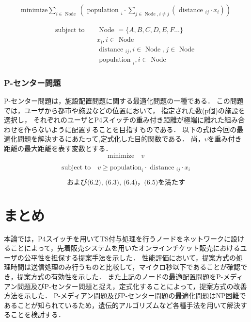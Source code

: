 \documentclass[a4j,11pt]{jreport}
\begin{document}
\begin{align}
  \label{p-median}
  \mbox{minimize}    \sum_{i \in \mbox{ Node }}\left(\mbox { population }_i \cdot \sum_{j \in \mbox { Node }, i \neq j}\left(\mbox { distance }_{i j} \cdot x_{i}\right)\right)
\end{align}

\begin{align}
  \text{subject to} \quad & \mbox{ Node }=\{A, B, C, D, E, F\dots\}                              \\
                          & x_{i}, i \in \mbox { Node }                                          \\
                          & \mbox { distance }_{i j}, i \in \mbox { Node }, j \in \mbox { Node } \\
                          & \mbox { population }_i, i \in \mbox { Node }
\end{align}


\subsection{P-センター問題}
P-センター問題は，施設配置問題に関する最適化問題の一種である．
この問題では，ユーザから都市や施設などの位置において，
指定された数(p個)の施設を選択し，
それぞれのユーザとP4スイッチの重み付き距離が極端に離れた組み合わせを作らないように配置することを目指すものである．
以下の式は今回の最適化問題を解決するにあたって,定式化した目的関数である．
尚，$v$を重み付き距離の最大距離を表す変数とする．
\begin{equation}
  \mbox{minimize} \quad v
\end{equation}

\begin{equation}
  \text{subject to} \quad v \geq \mbox{population}_i \cdot \mbox { distance }_{i j} \cdot x_{i}
\end{equation}

$$
  \mbox{および(6.2), (6.3), (6.4)，(6.5)を満たす}
$$


\chapter{まとめ}
本論では，P4スイッチを用いてTS付与処理を行うノードをネットワークに設けることによって，先着販売システムを用いたオンラインチケット販売におけるユーザの公平性を担保する提案手法を示した．
性能評価において，提案方式の処理時間は送信処理のみ行うものと比較して，マイクロ秒以下であることが確認でき，提案方式の有効性を示した．
また上記のノードの最適配置問題をP-メディアン問題及びP-センター問題と捉え，定式化することによって，提案方式の改善方法を示した．
P-メディアン問題及びP-センター問題の最適化問題はNP困難であることが知られているため，遺伝的アルゴリズムなど各種手法を用いて解決することを検討する．
\end{document}
